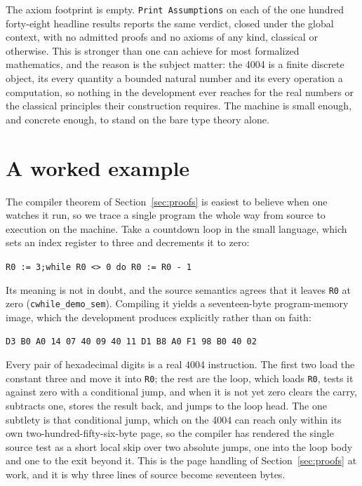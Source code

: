 \documentclass[11pt]{amsart}
\theoremstyle{plain}
\theoremstyle{definition}
\newcommand{\code}[1]{\texttt{#1}}
\begin{document}
The axiom footprint is empty. \code{Print Assumptions} on each of the one hundred forty-eight headline results reports the same verdict, closed under the global context, with no admitted proofs and no axioms of any kind, classical or otherwise. This is stronger than one can achieve for most formalized mathematics, and the reason is the subject matter: the 4004 is a finite discrete object, its every quantity a bounded natural number and its every operation a computation, so nothing in the development ever reaches for the real numbers or the classical principles their construction requires. The machine is small enough, and concrete enough, to stand on the bare type theory alone.

\section{A worked example}\label{sec:demo}

The compiler theorem of Section~\ref{sec:proofs} is easiest to believe when one watches it run, so we trace a single program the whole way from source to execution on the machine. Take a countdown loop in the small language, which sets an index register to three and decrements it to zero:
\begin{center}
\code{R0 := 3;\quad while R0 <> 0 do R0 := R0 - 1}
\end{center}
Its meaning is not in doubt, and the source semantics agrees that it leaves \code{R0} at zero (\code{cwhile\_demo\_sem}). Compiling it yields a seventeen-byte program-memory image, which the development produces explicitly rather than on faith:
\begin{center}
\code{D3 B0 A0 14 07 40 09 40 11 D1 B8 A0 F1 98 B0 40 02}
\end{center}
Every pair of hexadecimal digits is a real 4004 instruction. The first two load the constant three and move it into \code{R0}; the rest are the loop, which loads \code{R0}, tests it against zero with a conditional jump, and when it is not yet zero clears the carry, subtracts one, stores the result back, and jumps to the loop head. The one subtlety is that conditional jump, which on the 4004 can reach only within its own two-hundred-fifty-six-byte page, so the compiler has rendered the single source test as a short local skip over two absolute jumps, one into the loop body and one to the exit beyond it. This is the page handling of Section~\ref{sec:proofs} at work, and it is why three lines of source become seventeen bytes.
\end{document}

